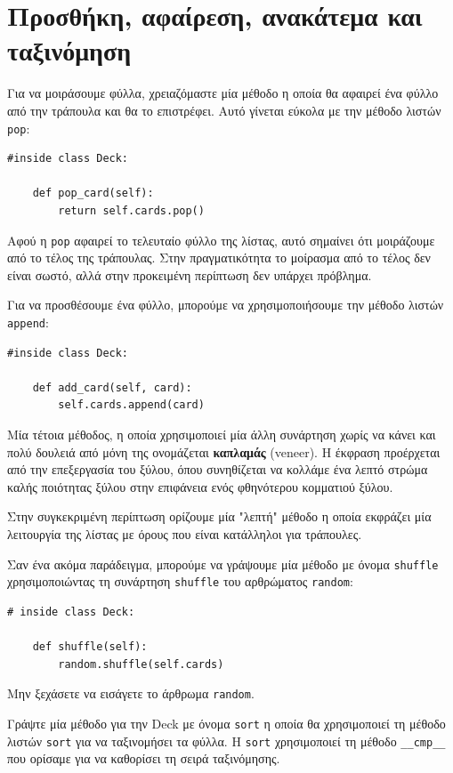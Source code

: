 \documentclass[10pt]{book}
\begin{document}
\section{Προσθήκη, αφαίρεση, ανακάτεμα και ταξινόμηση}

Για να μοιράσουμε φύλλα, χρειαζόμαστε μία μέθοδο η οποία θα αφαιρεί ένα φύλλο από την 
τράπουλα και θα το επιστρέφει. Αυτό γίνεται εύκολα με την μέθοδο λιστών {\tt pop}:

\begin{verbatim}
#inside class Deck:

    def pop_card(self):
        return self.cards.pop()
\end{verbatim}
%
Αφού η {\tt pop} αφαιρεί το τελευταίο φύλλο της λίστας, αυτό σημαίνει ότι μοιράζουμε από το τέλος της τράπουλας.
Στην πραγματικότητα το μοίρασμα από το τέλος δεν είναι σωστό, αλλά στην προκειμένη περίπτωση δεν υπάρχει
πρόβλημα.

Για να προσθέσουμε ένα φύλλο, μπορούμε να χρησιμοποιήσουμε την μέθοδο λιστών {\tt append}:

\begin{verbatim}
#inside class Deck:

    def add_card(self, card):
        self.cards.append(card)
\end{verbatim}
%
Μία τέτοια μέθοδος, η οποία χρησιμοποιεί μία άλλη συνάρτηση χωρίς να κάνει και πολύ 
δουλειά από μόνη της ονομάζεται {\bf καπλαμάς} (veneer). Η έκφραση προέρχεται από την επεξεργασία του ξύλου,
όπου συνηθίζεται να κολλάμε ένα λεπτό στρώμα καλής ποιότητας ξύλου στην επιφάνεια ενός φθηνότερου κομματιού
ξύλου.

Στην συγκεκριμένη περίπτωση ορίζουμε μία  "λεπτή" μέθοδο η οποία εκφράζει
μία λειτουργία της λίστας με όρους που είναι κατάλληλοι για τράπουλες.

Σαν ένα ακόμα παράδειγμα, μπορούμε να γράψουμε μία μέθοδο με όνομα {\tt shuffle}
χρησιμοποιώντας τη συνάρτηση {\tt shuffle} του αρθρώματος {\tt random}:

\begin{verbatim}
# inside class Deck:

    def shuffle(self):
        random.shuffle(self.cards)
\end{verbatim}
%
Μην ξεχάσετε να εισάγετε το άρθρωμα {\tt random}. 
\\
\begin{exercise}

Γράψτε μία μέθοδο για την Deck με όνομα {\tt sort} η οποία θα
χρησιμοποιεί τη μέθοδο λιστών {\tt sort} για να ταξινομήσει τα φύλλα. 
Η {\tt sort} χρησιμοποιεί τη μέθοδο \verb"__cmp__" που ορίσαμε για να
καθορίσει τη σειρά ταξινόμησης.

\end{exercise}
\end{document}
